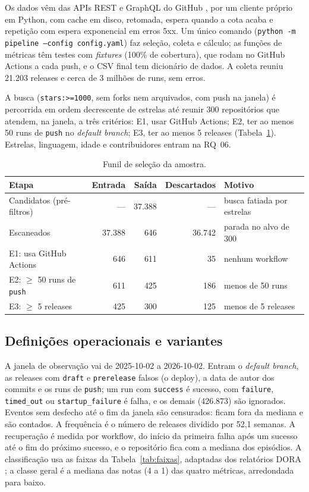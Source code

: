 \documentclass[12pt]{article}
\begin{document}
Os dados vêm das APIs REST e GraphQL do GitHub \cite{githubrest,githubgraphql},
por um cliente próprio em Python, com cache em disco, retomada, espera quando a
cota acaba e repetição com espera exponencial em erros 5xx. Um único comando
(\texttt{python -m pipeline --config config.yaml}) faz seleção, coleta e
cálculo; as funções de métricas têm testes com \emph{fixtures} (100\% de
cobertura), que rodam no GitHub Actions a cada push, e o CSV final tem
dicionário de dados. A coleta reuniu 21.203 releases e cerca de 3 milhões de
runs, sem erros.

A busca (\texttt{stars:>=1000}, sem forks nem arquivados, com push na janela) é
percorrida em ordem decrescente de estrelas até reunir 300 repositórios que
atendem, na janela, a três critérios: E1, usar GitHub Actions; E2, ter ao menos
50 runs de \texttt{push} no \emph{default branch}; E3, ter ao menos 5 releases
(Tabela~\ref{tab:funil}). Estrelas, linguagem, idade e contribuidores entram na
RQ~06.

\begin{table}[t]
  \centering
  \caption{Funil de seleção da amostra.}
  \label{tab:funil}
  \footnotesize
  \begin{tabular}{@{}lrrrl@{}}
    \toprule
    Etapa & Entrada & Saída & Descartados & Motivo \\
    \midrule
    Candidatos (pré-filtros) & --- & 37.388 & --- & busca fatiada por estrelas \\
    Escaneados & 37.388 & 646 & 36.742 & parada no alvo de 300 \\
    E1: usa GitHub Actions & 646 & 611 & 35 & nenhum workflow \\
    E2: $\geq$ 50 runs de \texttt{push} & 611 & 425 & 186 & menos de 50 runs \\
    E3: $\geq$ 5 releases & 425 & 300 & 125 & menos de 5 releases \\
    \bottomrule
  \end{tabular}
\end{table}

\subsection{Definições operacionais e variantes}
\label{sec:definicoes}
\label{sec:variantes}

A janela de observação vai de 2025-10-02 a 2026-10-02. Entram o \emph{default
branch}, as releases com \texttt{draft} e \texttt{prerelease} falsos (o
deploy), a data de autor dos commits e os runs de \texttt{push}; um run com
\texttt{success} é sucesso, com \texttt{failure}, \texttt{timed\_out} ou
\texttt{startup\_failure} é falha, e os demais (426.873) são ignorados. Eventos
sem desfecho até o fim da janela são censurados: ficam fora da mediana e são
contados. A frequência é o número de releases dividido por 52,1 semanas. A
recuperação é medida por workflow, do início da primeira falha após um sucesso
até o fim do próximo sucesso, e o repositório fica com a mediana dos episódios. A
classificação usa as faixas da Tabela~\ref{tab:faixas}, adaptadas dos relatórios
DORA \cite{dorastate}; a classe geral é a mediana das notas (4 a 1) das quatro
métricas, arredondada para baixo.
\end{document}
